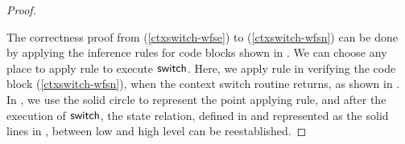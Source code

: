 \begin{proof}
    \begin{center}
        
        \vspace*{-0.5em}
        \label{fig:refinement reasoning}
    \end{center}

    The correctness proof from
    (\ref{ctxswitch-wfse}) to (\ref{ctxswitch-wfsn})
    can be done by applying the inference rules for
    code blocks shown in
    \Fig{\ref{fig:Selected Inference Rules for Refinement Verification}}.
    We can choose any place to apply
     rule to execute $\mathsf{switch}$.
    Here, we apply  rule
    in verifying the code block
    \SwitchNewTask{} (\ref{ctxswitch-wfsn}),
    when the context switch routine returns,
    as shown in \Fig{\ref{fig:refinement reasoning}}.
    In \Fig{\ref{fig:refinement reasoning}}, we use the
    solid circle to represent the point applying  rule,
    and after the execution of $\mathsf{switch}$, the
    state relation, defined in \Subsec{\ref{subsec:correctness-primitive}} 
    and represented as the solid lines in \Fig{\ref{fig:refinement reasoning}},
    between low and high level can
    be reestablished.
\end{proof}


